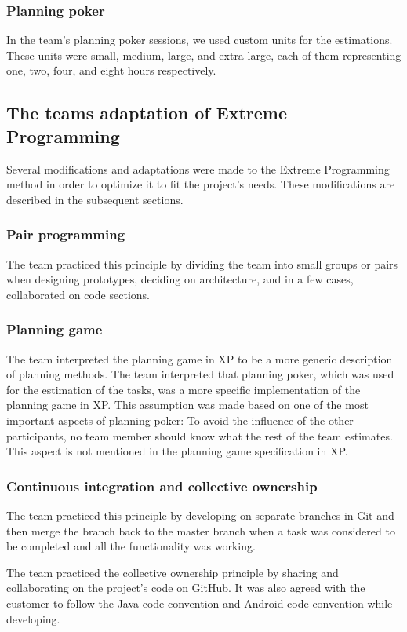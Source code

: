 \subsubsection{Planning poker}
In the team's planning poker sessions, we used custom units for the estimations. These units were small, medium, large, and extra large, each of them representing one, two, four, and eight hours respectively.

\subsection{The teams adaptation of Extreme Programming}
\label{sec:adapExtremeProgr}
Several modifications and adaptations were made to the Extreme Programming method in order to optimize it to fit the project's needs. These modifications are described in the subsequent sections.

\subsubsection{Pair programming}
The team practiced this principle by dividing the team into small groups or pairs when designing prototypes, deciding on architecture, and in a few cases, collaborated on code sections.

\subsubsection{Planning game}
The team interpreted the planning game in XP to be a more generic description of planning methods. The team interpreted that planning poker, which was used for the estimation of the tasks, was a more specific implementation of the planning game in XP. This assumption was made based on one of the most important aspects of planning poker: To avoid the influence of the other participants, no team member should know what the rest of the team estimates. This aspect is not mentioned in the planning game specification in XP.

\subsubsection{Continuous integration and collective ownership}
The team practiced this principle by developing on separate branches in Git and then merge the branch back to the master branch when a task was considered to be completed and all the functionality was working.

The team practiced the collective ownership principle by sharing and collaborating on the project's code on GitHub. It was also agreed with the customer to follow the Java code convention and Android code convention while developing.

